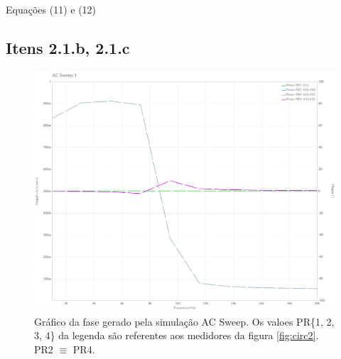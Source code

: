 \documentclass[11pt]{article}
\begin{document}
Equações (11) e (12)

\pagebreak

\subsection*{Itens 2.1.b, 2.1.c}

\begin{figure}[h!]
  \centering
  \includegraphics[width=.72\textwidth]{fig/2_sweep}
  \caption{Gráfico da fase gerado pela simulação AC Sweep. Os valoes PR\{1, 2, 3, 4\} da legenda são referentes aos medidores da figura \ref{fig:circ2}. PR2 $\equiv$ PR4.}
  \label{fig:2-sweep}
\end{figure}
\end{document}
